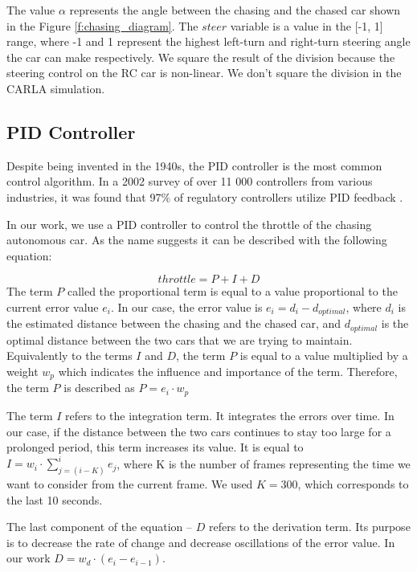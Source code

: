 The value $\alpha$ represents the angle between the chasing and the chased car shown in the Figure \ref{f:chasing_diagram}. The $steer$ variable is a value in the [-1, 1] range, where -1 and 1 represent the highest left-turn and right-turn steering angle the car can make respectively. We square the result of the division because the steering control on the RC car is non-linear. We don't square the division in the CARLA simulation.


\subsection{PID Controller}
Despite being invented in the 1940s, the PID controller is the most common control algorithm. In a 2002 survey of over 11 000 controllers from various industries, it was found that 97\% of regulatory controllers utilize PID feedback \cite{PID-usage}. 

In our work, we use a PID controller to control the throttle of the chasing autonomous car. As the name suggests it can be described with the following equation:

\begin{equation}
throttle = P+I+D    
\end{equation}
The term $P$ called the proportional term is equal to a value proportional to the current error value $e_i$. In our case, the error value is $e_i = d_i - d_{optimal}$, where $d_i$ is the estimated distance between the chasing and the chased car, and $d_{optimal}$ is the optimal distance between the two cars that we are trying to maintain. Equivalently to the terms $I$ and $D$, the term $P$ is equal to a value multiplied by a weight $w_p$ which indicates the influence and importance of the term. Therefore, the term $P$ is described as $P = e_i\cdot w_p$ \par


The term $I$ refers to the integration term. It integrates the errors over time. In our case, if the distance between the two cars continues to stay too large for a prolonged period, this term increases its value. It is equal to $I = w_i\cdot \sum_{j=(i-K)}^{i} e_j$, where K is the number of frames representing the time we want to consider from the current frame. We used $K = 300$, which corresponds to the last 10 seconds.\par


The last component of the equation -- $D$ refers to the derivation term. Its purpose is to decrease the rate of change and decrease oscillations of the error value. In our work $D = w_d\cdot (e_i-e_{i-1})$. \par


